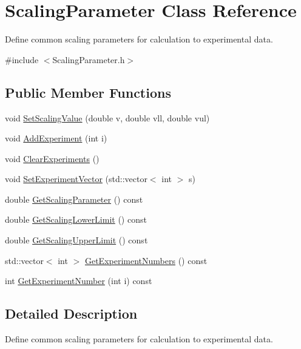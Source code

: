 \hypertarget{classScalingParameter}{\section{Scaling\-Parameter Class Reference}
\label{classScalingParameter}
}


Define common scaling parameters for calculation to experimental data.  




{\ttfamily \#include $<$Scaling\-Parameter.\-h$>$}

\subsection*{Public Member Functions}
\begin{DoxyCompactItemize}
\item 
void \hyperlink{classScalingParameter_a145bb832eed013418dcc2d1206e716c2}{Set\-Scaling\-Value} (double v, double vll, double vul)
\item 
void \hyperlink{classScalingParameter_a0df5af5ed8792882f967e63809e00a25}{Add\-Experiment} (int i)
\item 
void \hyperlink{classScalingParameter_aab921d6b200c9710ce094528c1f031a1}{Clear\-Experiments} ()
\item 
void \hyperlink{classScalingParameter_a4955775390f2d1c2b702f93ff5dd7386}{Set\-Experiment\-Vector} (std\-::vector$<$ int $>$ s)
\item 
double \hyperlink{classScalingParameter_a1b12c556f85254c57d3c245f787d85cf}{Get\-Scaling\-Parameter} () const 
\item 
double \hyperlink{classScalingParameter_ae6b4e7b3e43533ad4c602179f8dcaa5c}{Get\-Scaling\-Lower\-Limit} () const 
\item 
double \hyperlink{classScalingParameter_a8f08c1bb7dbbc652bb6068c06967a31c}{Get\-Scaling\-Upper\-Limit} () const 
\item 
std\-::vector$<$ int $>$ \hyperlink{classScalingParameter_a2c16f259c2b67a1ebd234f59dc4a8f8d}{Get\-Experiment\-Numbers} () const 
\item 
int \hyperlink{classScalingParameter_a0f160ce9db963a1cb57efd722d430030}{Get\-Experiment\-Number} (int i) const 
\end{DoxyCompactItemize}


\subsection{Detailed Description}
Define common scaling parameters for calculation to experimental data. 

